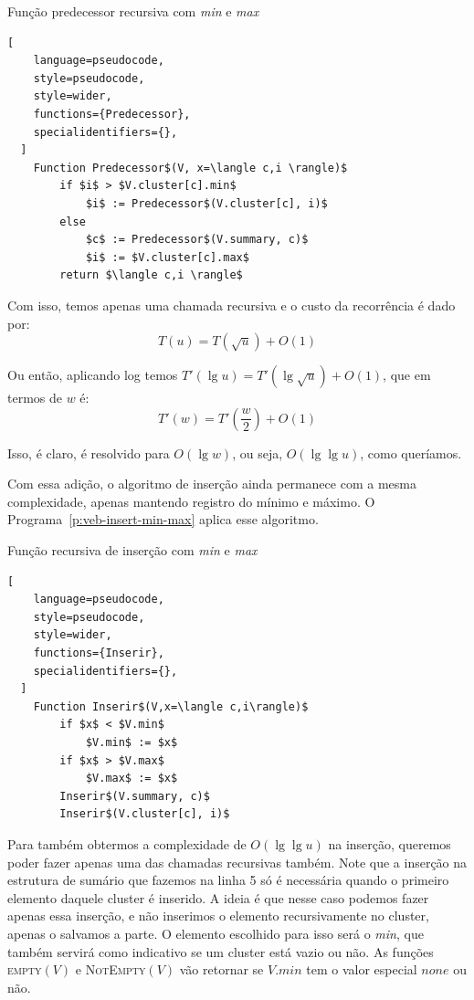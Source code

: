 \begin{programruledcaption}{Função predecessor recursiva com \emph{min} e \emph{max}\label{p:veb-predecessor-min-max}}
  \begin{lstlisting}[
    language=pseudocode,
    style=pseudocode,
    style=wider,
    functions={Predecessor},
    specialidentifiers={},
  ]
    Function Predecessor$(V, x=\langle c,i \rangle)$
        if $i$ > $V.cluster[c].min$
            $i$ := Predecessor$(V.cluster[c], i)$
        else
            $c$ := Predecessor$(V.summary, c)$
            $i$ := $V.cluster[c].max$
        return $\langle c,i \rangle$
  \end{lstlisting}
\end{programruledcaption}

Com isso, temos apenas uma chamada recursiva e o custo da recorrência é dado
por:
\[
T(u) = T(\sqrt u) + O(1)
\]

Ou então, aplicando log temos $T'(\lg u) = T'(\lg \sqrt u) + O(1)$, que em
termos de $w$ é:
\[
T'(w) = T'\left (\frac{w}{2}\right ) + O(1)
\]

Isso, é claro, é resolvido para $O(\lg w)$, ou seja, $O(\lg \lg u)$, como
queríamos.

Com essa adição, o algoritmo de inserção ainda permanece com a mesma
complexidade, apenas mantendo registro do mínimo e máximo. O
Programa~\ref{p:veb-insert-min-max} aplica esse algoritmo.

\begin{programruledcaption}{Função recursiva de inserção com \emph{min} e \emph{max} \label{p:veb-insert-min-max}}
  \begin{lstlisting}[
    language=pseudocode,
    style=pseudocode,
    style=wider,
    functions={Inserir},
    specialidentifiers={},
  ]
    Function Inserir$(V,x=\langle c,i\rangle)$
        if $x$ < $V.min$
            $V.min$ := $x$
        if $x$ > $V.max$
            $V.max$ := $x$
        Inserir$(V.summary, c)$
        Inserir$(V.cluster[c], i)$
  \end{lstlisting}
\end{programruledcaption}

Para também obtermos a complexidade de $O(\lg \lg u)$ na inserção, queremos
poder fazer apenas uma das chamadas recursivas também. Note que a inserção na
estrutura de sumário que fazemos na linha 5 só é necessária quando o primeiro
elemento daquele cluster é inserido. A ideia é que nesse caso podemos fazer
apenas essa inserção, e não inserimos o elemento recursivamente no cluster,
apenas o salvamos a parte. O elemento escolhido para isso será o \textit{min},
que também servirá como indicativo se um cluster está vazio ou não. As funções
\textsc{empty}$(V)$ e \textsc{NotEmpty}$(V)$ vão retornar se $V.min$ tem o valor
especial $none$ ou não. 

